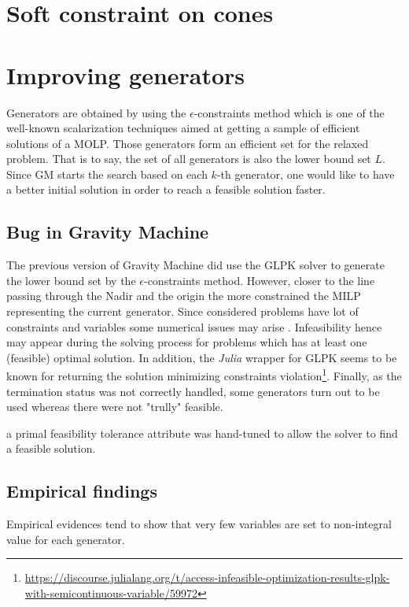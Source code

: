 \section{Soft constraint on cones}


\section{Improving generators}
Generators are obtained by using the $\epsilon$-constraints method which is one of the well-known scalarization techniques \cite{Chankong1983MultiobjectiveDM} aimed at getting a sample of efficient solutions of a MOLP. Those generators form an efficient set for the relaxed problem. That is to say, the set of all generators is also the lower bound set $L$. Since GM starts the search based on each $k$-th generator, one would like to have a better initial solution in order to reach a feasible solution faster.

\subsection{Bug in Gravity Machine}
The previous version of Gravity Machine did use the GLPK solver to generate the lower bound set by the $\epsilon$-constraints method. 
However, closer to the line passing through the Nadir and the origin the more constrained the MILP representing the current generator. 
Since considered problems have lot of constraints and variables some numerical issues may arise \cite{gurobiNumIssues}. Infeasibility hence
may appear during the solving process for problems which has at least one (feasible) optimal solution. In addition, the \textit{Julia} wrapper
for GLPK seems to be known for returning the solution minimizing constraints violation\footnote{\url{https://discourse.julialang.org/t/access-infeasible-optimization-results-glpk-with-semicontinuous-variable/59972}}.
Finally, as the termination status was not correctly handled, some generators turn out to be used whereas there were not "trully" feasible.  


a primal feasibility
tolerance attribute was hand-tuned to allow the solver to find a feasible solution.
\cite{bench_solver}



\subsection{Empirical findings}
Empirical evidences tend to show that very few variables are set to non-integral value for each generator.

